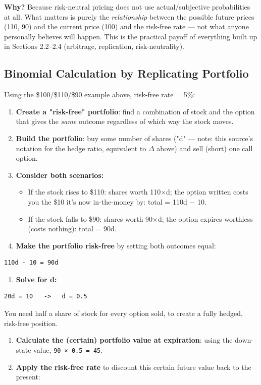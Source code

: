 \documentclass[12pt,openany]{book}
\theoremstyle{definition}
\theoremstyle{remark}
\begin{document}
\textbf{Why?} Because risk-neutral pricing does not use actual/subjective probabilities at all. What matters is purely the \emph{relationship} between the possible future prices (110, 90) and the current price (100) and the risk-free rate — not what anyone personally believes will happen. This is the practical payoff of everything built up in Sections 2.2–2.4 (arbitrage, replication, risk-neutrality).

\subsection{Binomial Calculation by Replicating Portfolio}

Using the \$100/\$110/\$90 example above, risk-free rate = 5\%:

\begin{enumerate}
\item \textbf{Create a "risk-free" portfolio}: find a combination of stock and the option that gives the \emph{same} outcome regardless of which way the stock moves.
\item \textbf{Build the portfolio}: buy some number of shares ("d" — note: this source's notation for the hedge ratio, equivalent to \ensuremath{\Delta} above) and sell (short) one call option.
\item \textbf{Consider both scenarios:}
\begin{itemize}
\item If the stock rises to \$110: shares worth 110×d; the option written costs you the \$10 it's now in-the-money by: total = 110d − 10.
\item If the stock falls to \$90: shares worth 90×d; the option expires worthless (costs nothing): total = 90d.
\end{itemize}
\item \textbf{Make the portfolio risk-free} by setting both outcomes equal:
\end{enumerate}
\begin{lstlisting}[style=notesCode]
   110d - 10 = 90d
\end{lstlisting}
\begin{enumerate}
\item \textbf{Solve for d:}
\end{enumerate}
\begin{lstlisting}[style=notesCode]
   20d = 10   ->   d = 0.5
\end{lstlisting}
   You need half a share of stock for every option sold, to create a fully hedged, risk-free position.
\begin{enumerate}
\item \textbf{Calculate the (certain) portfolio value at expiration}: using the down-state value, \texttt{90 × 0.5 = 45}.
\item \textbf{Apply the risk-free rate} to discount this certain future value back to the present:
\end{enumerate}
\end{document}

